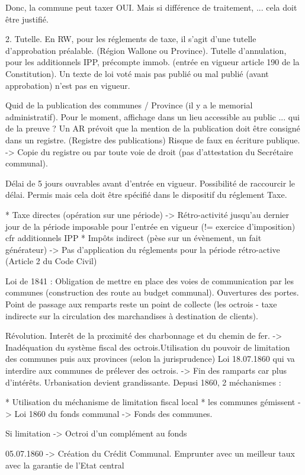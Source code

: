 \documentclass{book}
\begin{document}
Donc, la commune peut taxer OUI. Mais si différence de traitement, ... cela doit être justifié.

2. Tutelle. En RW, pour les réglements de taxe, il s'agit d'une tutelle d'approbation préalable. (Région Wallone ou Province). Tutelle d'annulation, pour les additionnels IPP, précompte immob. (entrée en vigueur article 190 de la Constitution). Un texte de loi voté mais pas publié ou mal publié (avant approbation) n'est pas en vigueur.

Quid de la publication des communes / Province (il y a le memorial administratif). Pour le moment, affichage dans un lieu accessible au public ... qui de la preuve ? Un AR prévoit que la mention de la publication doit être consigné dans un registre. (Registre des publications) Risque de faux en écriture publique. -> Copie du registre ou par toute voie de droit (pas d'attestation du Secrétaire communal).

Délai de 5 jours ouvrables avant d'entrée en vigueur. Possibilité de raccourcir le délai. Permis mais cela doit être spécifié dans le dispositif du réglement Taxe. 

* Taxe directes (opération sur une période) -> Rétro-activité jusqu'au dernier jour de la période imposable pour l'entrée en vigueur (!= exercice d'imposition) cfr additionnels IPP
* Impôts indirect (pèse sur un évènement, un fait générateur) -> Pas d'application du réglements pour la période rétro-active (Article 2 du Code Civil)


Loi de 1841 : Obligation de mettre en place des voies de communication par les communes (construction des route au budget communal). Ouvertures des portes. Point de passage aux remparts reste un point de collecte (les octrois - taxe indirecte sur la circulation des marchandises à destination de clients).

Révolution. Interêt de la proximité des charbonnage et du chemin de fer. -> Inadéquation du système fiscal des octrois.Utilisation du pouvoir de limitation des communes puis aux provinces (selon la jurisprudence) Loi 18.07.1860 qui va interdire aux communes de prélever des octrois. -> Fin des ramparts car plus d'intérêts. Urbanisation devient grandissante. Depusi 1860, 2 méchanismes :

* Utilisation du méchanisme de limitation fiscal local
* les communes gémissent -> Loi 1860 du fonds communal -> Fonds des communes. 

Si limitation -> Octroi d'un complément au fonds

05.07.1860 -> Création du Crédit Communal. Emprunter avec un meilleur taux avec la garantie de l'Etat central
\end{document}
